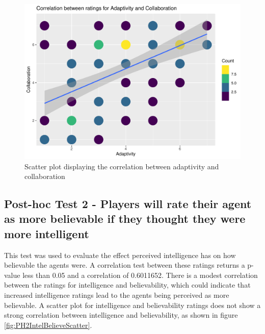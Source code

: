 \documentclass{IEEEtran}
\begin{document}
\begin{figure}
  \centering
  \includegraphics[width=\linewidth]{Images/Graphs/PH1AdapCollabScatter.pdf}
  
\caption{Scatter plot displaying the correlation between adaptivity and collaboration}
\label{fig:PH1AdapCollabScatter}
\end{figure}

\subsection{Post-hoc Test 2 - Players will rate their agent as more believable if they thought they were more intelligent}

This test was used to evaluate the effect perceived intelligence has on how believable the agents were. A correlation test between these ratings returns a p-value less than 0.05 and a correlation of 0.6011652. There is a modest correlation between the ratings for intelligence and believability, which could indicate that increased intelligence ratings lead to the agents being perceived as more believable. A scatter plot for intelligence and believability ratings does not show a strong correlation between intelligence and believability, as shown in figure \ref{fig:PH2IntelBelieveScatter}.
\end{document}
